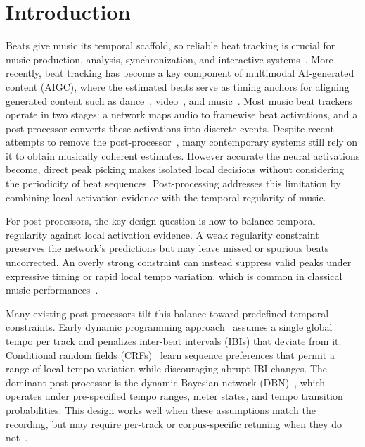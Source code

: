 \documentclass{article}
\begin{document}
\section{Introduction}
\label{sec:intro}
Beats give music its temporal scaffold, so reliable beat tracking is crucial for music production, analysis, synchronization, and interactive systems~\cite{purwins2019deep}. More recently, beat tracking has become a key component of multimodal AI-generated content (AIGC), where the estimated beats serve as timing anchors for aligning generated content such as dance~\cite{tseng2023edge, huang2024beatit}, video~\cite{yu2023loris, tong2026vem}, and music~\cite{lan2024musicongen, chen2024musicldm}. Most music beat trackers operate in two stages: a network maps audio to framewise beat activations, and a post-processor converts these activations into discrete events. Despite recent attempts to remove the post-processor~\cite{chen2022postprocessingfree, foscarin2024beat, bolt2026reformulated}, many contemporary systems \cite{deng2024efficient, ru2025hingenet, ru2025beatfm, ru2026beatmamba, zhang2025beatkan} still rely on it to obtain musically coherent estimates. However accurate the neural activations become, direct peak picking makes isolated local decisions without considering the periodicity of beat sequences. Post-processing addresses this limitation by combining local activation evidence with the temporal regularity of music.

For post-processors, the key design question is how to balance temporal regularity against local activation evidence. A weak regularity constraint preserves the network's predictions but may leave missed or spurious beats uncorrected. An overly strong constraint can instead suppress valid peaks under expressive timing or rapid local tempo variation, which is common in classical music performances~\cite{Schreiber2020LocalTempo}.

Many existing post-processors tilt this balance toward predefined temporal constraints. Early dynamic programming approach~\cite{ellis2007beattracking} assumes a single global tempo per track and penalizes inter-beat intervals (IBIs) that deviate from it. Conditional random fields (CRFs)~\cite{fillon2015crf, fuentes2019skipchain} learn sequence preferences that permit a range of local tempo variation while discouraging abrupt IBI changes. The dominant post-processor is the dynamic Bayesian network (DBN)~\cite{krebs2015dbn, bock2016joint}, which operates under pre-specified tempo ranges, meter states, and tempo transition probabilities. This design works well when these assumptions match the recording, but may require per-track or corpus-specific retuning when they do not~\cite{ahn2026smcblindspot}.
\end{document}
